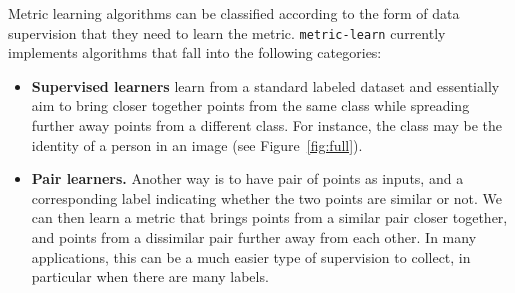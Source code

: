 \documentclass[twoside,11pt]{article}
\begin{document}
Metric learning algorithms can be classified according to the form of data supervision that they need to learn the metric. \texttt{metric-learn} currently implements algorithms that fall into the following categories:
\begin{itemize}
\item \textbf{Supervised learners} learn from a standard labeled dataset and essentially aim to bring closer together points from the same class while spreading further away points from a different class. For instance, the class may be the identity of a person in an image (see Figure~\ref{fig:full}). 
\item \textbf{Pair learners.} 
Another way is to have pair of points as inputs, and a corresponding label indicating whether the two points are similar or not. We can then learn a metric that brings points from a similar pair closer together, and points from a dissimilar pair further away from each other. In many applications, this can be a much easier type of supervision to collect, in particular when there are many labels. %

\end{itemize}
\end{document}
